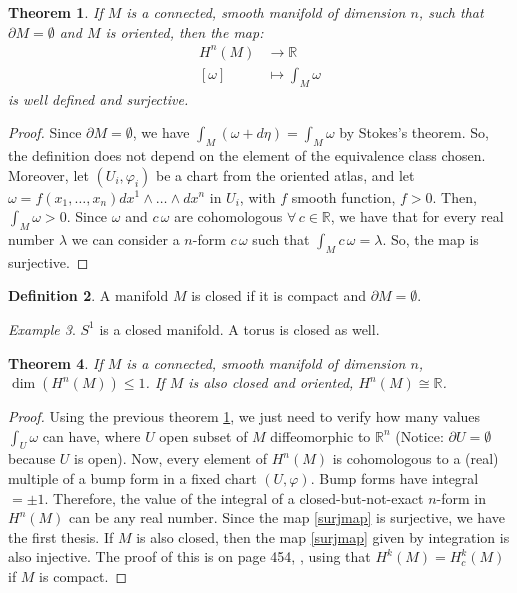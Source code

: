 \documentclass[a4paper,11pt,titlepage, article, oneside]{memoir}
\numberwithin{equation}{section}
\newtheorem{theorem}{Theorem}[section]
\theoremstyle{definition}
\newtheorem{definition}[theorem]{Definition}
\theoremstyle{remark}
\newtheorem{example}[theorem]{Example}
\newcommand{\rfield}{\mathbb{R}}
\begin{document}
\begin{theorem} \label{surjintegral}
If $M$ is a connected, smooth manifold of dimension $n$, such that $\partial M = \emptyset$ and $M$ is oriented, then the map:
\begin{align} \label{surjmap}
H^n(M) &\rightarrow \rfield \\
[\omega] &\mapsto \int_M \omega \nonumber
\end{align}
is well defined and surjective.
\end{theorem}
\begin{proof}
Since $\partial M = \emptyset$, we have $\int_M (\omega + d \eta) = \int_M \omega$ by Stokes's theorem. So, the definition does not depend on the element of the equivalence class chosen. Moreover, let $(U_i, \varphi_i)$  be a chart from the oriented atlas, and let $\omega=f(x_1, \ldots, x_n) dx^1 \wedge \ldots \wedge dx^n$ in $U_i$, with $f$ smooth function, $f > 0$. Then, $\int_M \omega > 0$. Since $\omega$ and $c \, \omega$ are cohomologous $\forall \, c \in \rfield$, we have that for every real number $\lambda$ we can consider a $n$-form $c\,  \omega$ such that $\int_M c\, \omega = \lambda$. So, the map is surjective.
\end{proof}

\begin{definition} \label{closedman}
A manifold $M$ is closed if it is compact and $\partial M = \emptyset$.
\end{definition}

\begin{tcolorbox}
\begin{example}
$S^1$ is a closed manifold. A torus is closed as well.
\end{example}
\end{tcolorbox}

\begin{theorem} \label{1dimthm}
If $M$ is a connected, smooth manifold of dimension $n$, $\dim \left( H^n(M) \right) \le 1$. If $M$ is also closed and oriented, $H^n(M) \cong \rfield$.
\end{theorem}
\begin{proof}
Using the previous theorem \ref{surjintegral}, we just need to verify how many values $\int_U \omega$ can have, where $U$ open subset of $M$ diffeomorphic to $\rfield^n$ (Notice: $\partial U = \emptyset$ because $U$ is open). Now, every element of $H^n(M)$ is cohomologous to a (real) multiple of  a bump form in a fixed chart $(U, \varphi)$. Bump forms have integral $ =\pm 1$. Therefore, the value of the integral of a closed-but-not-exact $n$-form in $H^n(M)$ can be any real number. Since the map \eqref{surjmap} is surjective, we have the first thesis. If $M$ is also closed, then the map \eqref{surjmap} given by integration is also injective. The proof of this is on page 454, , using that $H^k(M)=H_c^k(M)$ if $M$ is compact.
\end{proof}
\end{document}
